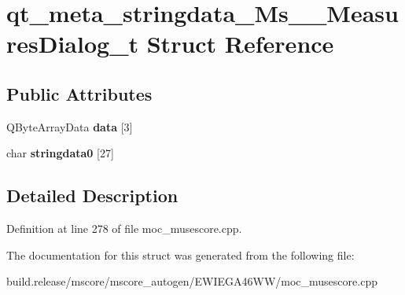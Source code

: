 \hypertarget{structqt__meta__stringdata___ms_____measures_dialog__t}{}\section{qt\+\_\+meta\+\_\+stringdata\+\_\+\+Ms\+\_\+\+\_\+\+Measures\+Dialog\+\_\+t Struct Reference}
\label{structqt__meta__stringdata___ms_____measures_dialog__t}
\subsection*{Public Attributes}
\begin{DoxyCompactItemize}
\item 
\mbox{\label{structqt__meta__stringdata___ms_____measures_dialog__t_a76e895711e308140b01bb64cbaff7c63}} 
Q\+Byte\+Array\+Data {\bfseries data} \mbox{[}3\mbox{]}
\item 
\mbox{\label{structqt__meta__stringdata___ms_____measures_dialog__t_a3f7ca6f4af520c4216a3f724f849ecc6}} 
char {\bfseries stringdata0} \mbox{[}27\mbox{]}
\end{DoxyCompactItemize}


\subsection{Detailed Description}


Definition at line 278 of file moc\+\_\+musescore.\+cpp.



The documentation for this struct was generated from the following file\+:\begin{DoxyCompactItemize}
\item 
build.\+release/mscore/mscore\+\_\+autogen/\+E\+W\+I\+E\+G\+A46\+W\+W/moc\+\_\+musescore.\+cpp\end{DoxyCompactItemize}
